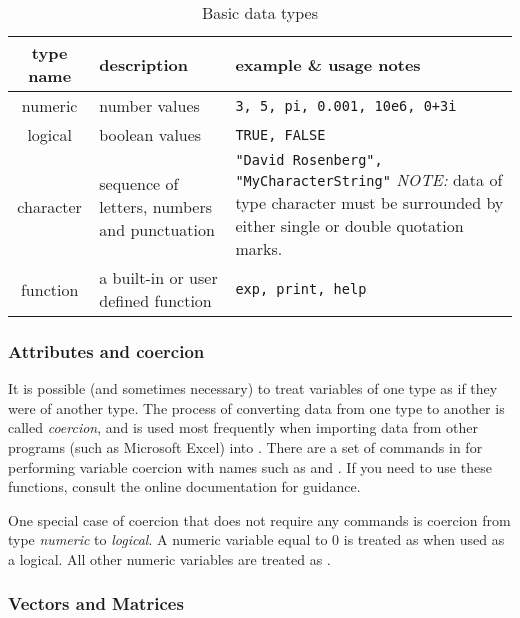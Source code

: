 \documentclass[10pt,letterpaper]{article}
\begin{document}
\begin{table}[htbp]
  \bc
  \begin{tabular}{cp{3.5cm}p{8cm}}
    \toprule
    type name & description & example \& usage notes \\
    \midrule
    numeric & number values & \texttt{3, 5, pi, 0.001, 10e6, 0+3i} \\
    logical & boolean values & \texttt{TRUE, FALSE} \\
    character & sequence of letters, numbers and punctuation & \texttt{"David Rosenberg", "MyCharacterString"} \emph{NOTE:} data of type character must be surrounded by either single or double quotation marks. \\
    function & a built-in or user defined function & \texttt{exp, print, help}\\
    \bottomrule
  \end{tabular}
  \caption{\label{tab:type_table}Basic data types}
  \ec
\end{table}



\subsubsection{Attributes and coercion} %
\label{ssub:attributes_and_coercion}

It is possible (and sometimes necessary) to treat variables of one type as if they were of another type.  The process of converting data from one type to another is called \emph{coercion}, and is used most frequently when importing data from other programs (such as Microsoft Excel) into \R.  There are a set of commands in \R for performing variable coercion with names such as  and .  If you need to use these functions, consult the online documentation for guidance.

One special case of coercion that does not require any commands is coercion from type \emph{numeric} to \emph{logical}.  A numeric variable equal to $0$ is treated as  when used as a logical.  All other numeric variables are treated as .



\subsubsection{Vectors and Matrices} %
\label{ssub:vectors}
\end{document}
